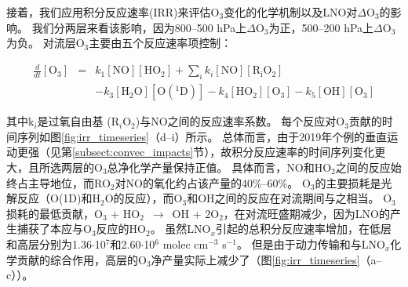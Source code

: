 接着，我们应用积分反应速率(IRR)来评估O$_3$变化的化学机制以及LNO对$\Delta$O$_3$的影响。
我们分两层来看该影响，因为800--500 hPa上$\Delta$O$_3$为正，500--200 hPa上$\Delta$O$_3$为负。
对流层O$_3$主要由五个反应速率项控制\citep{Pickering.1990}：

\begin{eqnarray}
  \frac{d}{dt}[\mathrm{O_3}] & = & k_1[\mathrm{NO}][\mathrm{HO_2}] + \sum_{i}  k_i[\mathrm{NO}][\mathrm{R_iO_2}] \nonumber \\
                             && - k_3[\mathrm{H_2O}][\mathrm{O(^1D)}] - k_4[\mathrm{HO_2}][\mathrm{O_3}] - k_5[\mathrm{OH}][\mathrm{O_3}]
\end{eqnarray}

其中k$_i$是过氧自由基 (R$_i$O$_2$)与NO之间的反应速率系数。
每个反应对O$_3$贡献的时间序列如图\ref{fig:irr_timeseries}（d--i）所示。
总体而言，由于2019年个例的垂直运动更强（见第\ref{subsect:convec_impacts}节），故积分反应速率的时间序列变化更大，且所选两层的O$_3$总净化学产量保持正值。
具体而言，NO和HO$_2$之间的反应始终占主导地位，而RO$_2$对NO的氧化约占该产量的40\%--60\%。
O$_3$的主要损耗是光解反应（O(1D)和H$_2$O的反应），而O$_3$和OH之间的反应在对流期间与之相当。
O$_3$损耗的最低贡献，O$_3$ + HO$_2$ $\,\to\,$ OH + 2O$_2$，在对流旺盛期减少，因为LNO的产生捕获了本应与O$_3$反应的HO$_2$。
虽然LNO$_x$引起的总积分反应速率增加，在低层和高层分别为1.36$\cdot$10$^7$和2.60$\cdot$10$^6$ molec cm$^{-3}$ s$^{-1}$。
但是由于动力传输和与LNO$_x$化学贡献的综合作用，高层的O$_3$净产量实际上减少了（图\ref{fig:irr_timeseries}（a--c））。



